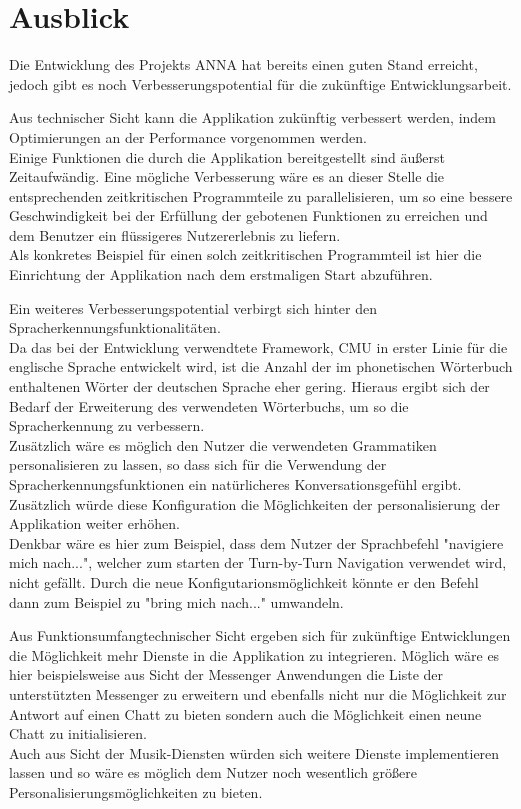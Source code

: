 \chapter{Ausblick}
\label{ausblick}
Die Entwicklung des Projekts \ac{ANNA} hat bereits einen guten Stand erreicht, jedoch gibt es noch Verbesserungspotential für die zukünftige Entwicklungsarbeit.

Aus technischer Sicht kann die Applikation zukünftig verbessert werden, indem Optimierungen an der Performance vorgenommen werden.\\
Einige Funktionen die durch die Applikation bereitgestellt sind äußerst Zeitaufwändig. Eine mögliche Verbesserung wäre es an dieser Stelle die entsprechenden zeitkritischen Programmteile zu parallelisieren, um so eine bessere Geschwindigkeit bei der Erfüllung der gebotenen Funktionen zu erreichen und dem Benutzer ein flüssigeres Nutzererlebnis zu liefern.\\
Als konkretes Beispiel für einen solch zeitkritischen Programmteil ist hier die Einrichtung der Applikation nach dem erstmaligen Start abzuführen.

Ein weiteres Verbesserungspotential verbirgt sich hinter den Spracherkennungsfunktionalitäten.\\
Da das bei der Entwicklung verwendtete Framework, \ac{CMU} in erster Linie für die englische Sprache entwickelt wird, ist die Anzahl der im phonetischen Wörterbuch enthaltenen Wörter der deutschen Sprache eher gering. Hieraus ergibt sich der Bedarf der Erweiterung des verwendeten Wörterbuchs, um so die Spracherkennung zu verbessern.\\
Zusätzlich wäre es möglich den Nutzer die verwendeten Grammatiken personalisieren zu lassen, so dass sich für die Verwendung der Spracherkennungsfunktionen ein natürlicheres Konversationsgefühl ergibt. Zusätzlich würde diese Konfiguration die Möglichkeiten der personalisierung der Applikation weiter erhöhen.\\
Denkbar wäre es hier zum Beispiel, dass dem Nutzer der Sprachbefehl "navigiere mich nach...", welcher zum starten der Turn-by-Turn Navigation verwendet wird, nicht gefällt. Durch die neue Konfigutarionsmöglichkeit könnte er den Befehl dann zum Beispiel zu "bring mich nach..." umwandeln.

Aus Funktionsumfangtechnischer Sicht ergeben sich für zukünftige Entwicklungen die Möglichkeit mehr Dienste in die Applikation zu integrieren. Möglich wäre es hier beispielsweise aus Sicht der Messenger Anwendungen die Liste der unterstützten Messenger zu erweitern und ebenfalls nicht nur die Möglichkeit zur Antwort auf einen Chatt zu bieten sondern auch die Möglichkeit einen neune Chatt zu initialisieren.\\
Auch aus Sicht der Musik-Diensten würden sich weitere Dienste implementieren lassen und so wäre es möglich dem Nutzer noch wesentlich größere Personalisierungsmöglichkeiten zu bieten.

